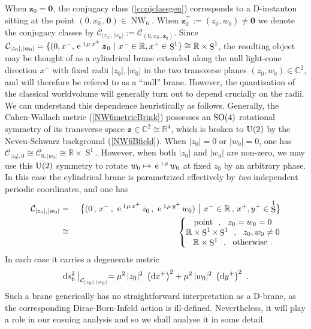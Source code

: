 \documentclass[11pt,a4paper]{article}
\DeclareMathOperator{\Sphere}{S}
\DeclareMathOperator{\NW}{NW}
\let\S\Sphere
\newcommand{\ii}{{\rm i}}
\newcommand{\mbf}[1]{{\boldsymbol {#1} }}
\def\ii{{\,{\rm i}\,}}
\def\dd{{\rm d}}
\def\mz{{\mbf z}}
\newcommand{\complex}{{\mathbb C}} %
\newcommand{\real}{{\mathbb R}} %
\def\nn{\nonumber}
\def\e{{\,\rm e}\,}
\def\bea{\begin{eqnarray}}
\newcommand{\beq}{\begin{eqnarray}}
\newcommand{\eeq}{\end{eqnarray}}
\begin{document}
When $\mz_0={\mbf0}$, the conjugacy class (\ref{conjclassgen})
corresponds to a D-instanton sitting at the point
$(0,x_0^-,\mbf0)\in\NW_6$. When
$\mz_0^\top:=(z^{~}_0,w^{~}_0)\neq\mbf0$ we denote the conjugacy
classes by $\mathcal{C}^{~}_{|z_0|,|w_0|}:=\mathcal{C}_{(0,x_0^-,\mz^{~}_0)}$.
Since
$\mathcal{C}_{|z_0|,|w_0|}=\{(0,x^-,\e^{\ii\mu\,x^+}\,\mz_0~|~
x^-\in\real,x^+\in\S^1\}\cong\real\times\S^1$, the resulting object
may be thought of as a cylindrical brane extended along the null
light-cone direction $x^-$ with fixed radii $|z_0|,|w_0|$ in the two
transverse planes $(z_0,w_0)\in\complex^2$, and will therefore be
refered to as a ``null'' brane. However, the quantization of the
classical worldvolume will generally turn out to depend crucially on
the radii. We can understand this dependence heuristically as
follows. Generally, the Cahen-Wallach metric
(\ref{NW6metricBrink}) possesses an ${\rm SO}(4)$ rotational symmetry of its
transverse space $\mz\in\complex^2\cong\real^4$, which is broken to
${\rm U}(2)$ by the Neveu-Schwarz background (\ref{NW6Bfield}). When
$|z_0|=0$ or $|w_0|=0$, one has
$\mathcal{C}_{|z_0|,0}\cong\mathcal{C}_{0,|w_0|}\cong\real\times\S^1$.
However, when both $|z_0|$ and $|w_0|$ are non-zero, we may use this ${\rm
U}(2)$ symmetry to rotate $w_0\mapsto\e^{\ii\phi}\,w_0$ at fixed $z_0$ by an
arbitrary phase. In this case the cylindrical brane is parametrized effectively
by {\it two} independent periodic coordinates, and one has
\bea
\mathcal{C}_{|z_0|,|w_0|}&=&~\bigl.\bigl\{(0\,,\,x^-\,,\,\e^{\ii\mu\,
  x^+}\,z_0\,,\,\e^{\ii\mu\,y^+}\,w_0)~\bigr|~x^-\in\real\,,\,x^+,y^+
\in\S^1\bigr\}\nn\\&\cong&\left\{\begin{matrix}{\rm point}~~,~~z_0=w_0=0
    \\ \real\times\S^1\times\S^1~~,~~z_0,w_0\neq0 \\
\real\times\S^1~~,~~{\rm otherwise} \ . \end{matrix}\right.
\label{cylnullbrane}\eeq
In each case it carries a degenerate metric
\beq
\dd s_6^2\bigm|_{\mathcal{C}_{|z_0|,|w_0|}}=\mu^2\,|z_0|^2~\left(\dd
  x^+\right)^2+\mu^2\,|w_0|^2~\left(\dd y^+\right)^2 \ .
\label{degmetricnull}\eeq
Such a brane generically has no straightforward interpretation as a
D-brane, as the corresponding Dirac-Born-Infeld action is
ill-defined. Nevertheless, it will play a role in our ensuing analysis
and so we shall analyse it in some detail.
\end{document}
